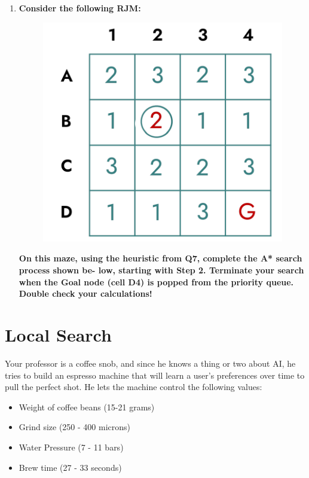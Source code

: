 \documentclass[a4paper]{article}
\begin{document}
\begin{sloppypar}
\begin{enumerate}[start=6,label=Q\arabic*,left=0pt]
    \item \textbf{Consider the following RJM:}
    \begin{figure}[H]
        \centering  
        \includegraphics[height=0.2\textheight]{Q8_RJM.png}
        \label{fig:Q8_RJM}
    \end{figure}
    \textbf{On this maze, using the heuristic from Q7, complete the A* search process shown be- low, starting with Step 2. Terminate your search when the Goal node (cell D4) is popped from the priority queue. Double check your calculations!}

\end{enumerate}

\section{Local Search}

Your professor is a coffee snob, and since he knows a thing or two about AI, he tries to
build an espresso machine that will learn a user’s preferences over time to pull the perfect
shot. He lets the machine control the following values:

\begin{itemize}
    \item Weight of coffee beans (15-21 grams)
    \item Grind size (250 - 400 microns)
    \item Water Pressure (7 - 11 bars)
    \item Brew time (27 - 33 seconds)
\end{itemize}


\end{sloppypar}
\end{document}
